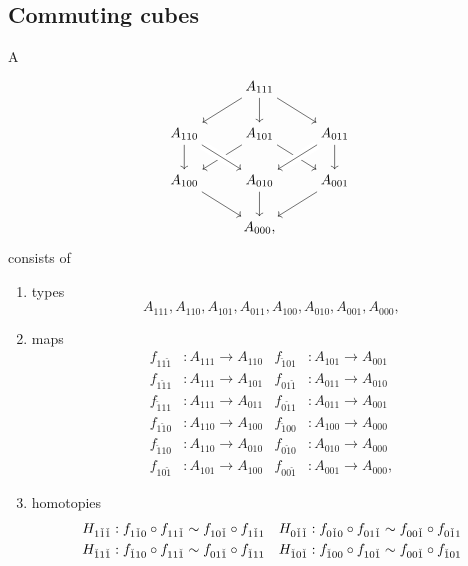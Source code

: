 \subsection{Commuting cubes}
\begin{defn}\label{defn:cube}
A 
\begin{equation*}
\begin{tikzcd}
& A_{111} \arrow[dl] \arrow[dr] \arrow[d] \\
A_{110} \arrow[d] & A_{101} \arrow[dl] \arrow[dr] & A_{011} \arrow[dl,crossing over] \arrow[d] \\
A_{100} \arrow[dr] & A_{010} \arrow[d] \arrow[from=ul,crossing over] & A_{001} \arrow[dl] \\
& A_{000},
\end{tikzcd}
\end{equation*}
consists of 
\begin{enumerate}
\item types
\begin{equation*}
A_{111},A_{110},A_{101},A_{011},A_{100},A_{010},A_{001},A_{000},
\end{equation*}
\item \begin{samepage}%
maps
\begin{align*}
f_{11\check{1}} & : A_{111}\to A_{110} & f_{\check{1}01} & : A_{101}\to A_{001} \\
f_{1\check{1}1} & : A_{111}\to A_{101} & f_{01\check{1}} & : A_{011}\to A_{010} \\
f_{\check{1}11} & : A_{111}\to A_{011} & f_{0\check{1}1} & : A_{011}\to A_{001} \\
f_{1\check{1}0} & : A_{110}\to A_{100} & f_{\check{1}00} & : A_{100}\to A_{000} \\
f_{\check{1}10} & : A_{110}\to A_{010} & f_{0\check{1}0} & : A_{010}\to A_{000} \\
f_{10\check{1}} & : A_{101}\to A_{100} & f_{00\check{1}} & : A_{001}\to A_{000},
\end{align*}
\end{samepage}%
\item homotopies
\begin{align*}
H_{1\check{1}\check{1}} & : f_{1\check{1}0}\circ f_{11\check{1}} \htpy f_{10\check{1}}\circ f_{1\check{1}1} & H_{0\check{1}\check{1}} & : f_{0\check{1}0}\circ f_{01\check{1}} \htpy f_{00\check{1}}\circ f_{0\check{1}1} \\
H_{\check{1}1\check{1}} & : f_{\check{1}10}\circ f_{11\check{1}} \htpy f_{01\check{1}}\circ f_{\check{1}11} & H_{\check{1}0\check{1}} & : f_{\check{1}00}\circ f_{10\check{1}} \htpy f_{00\check{1}}\circ f_{\check{1}01} \\

\end{align*}
\end{enumerate}
\end{defn}
